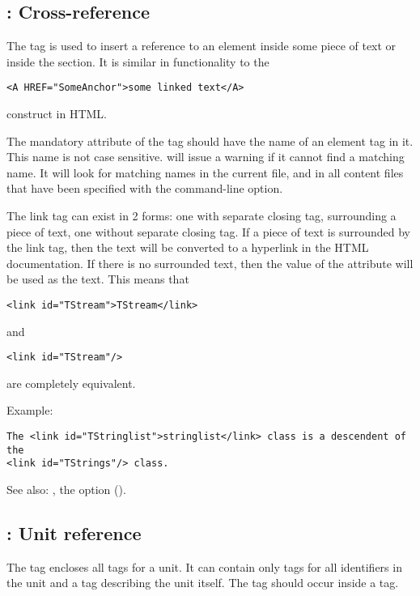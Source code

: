 \subsection{ : Cross-reference}
\label{tag:link}
The  tag is used to insert a reference to an element inside some
piece of text or inside the  section. It is similar in
functionality to the 
\begin{verbatim}
<A HREF="SomeAnchor">some linked text</A>
\end{verbatim}
construct in HTML.

The mandatory  attribute of the  tag should have the 
name of an element tag in it. This name is not case sensitive. \fpdoc
will issue a warning if it cannot find a matching name. It will look for
matching names in the current file, and in all content files that have been
specified with the  command-line option.

The link tag can exist in 2 forms: one with separate closing tag,
surrounding a piece of text, one without separate closing tag. If a piece of
text is surrounded by the link tag, then the text will be converted to a
hyperlink in the HTML documentation. If there is no surrounded text, then
the value of the  attribute will be used as the text. This means
that
\begin{verbatim}
<link id="TStream">TStream</link>
\end{verbatim}
and
\begin{verbatim}
<link id="TStream"/>
\end{verbatim}
are completely equivalent.

Example:
\begin{verbatim}
The <link id="TStringlist">stringlist</link> class is a descendent of the
<link id="TStrings"/> class.
\end{verbatim}

See also: , the  option ().

\subsection{ : Unit reference}
\label{tag:module}
The  tag encloses all  tags for a unit. It can
contain only  tags for all identifiers in the unit and 
a  tag describing the unit itself. The  tag should
occur inside a  tag.

